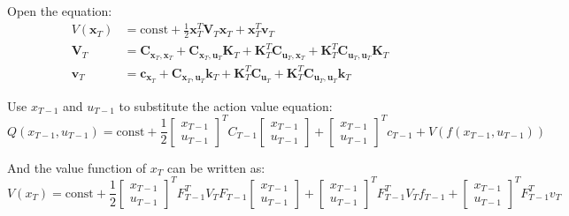 \documentclass[10pt]{elegantbook}
\begin{document}
Open the equation:
\begin{align*}
V(\bm{x}_T) &= \text{const} + \frac{1}{2} \bm{x}_T^T \bm{V}_T \bm{x}_T + \bm{x}_T^T \bm{v}_T \\
\bm{V}_T &= \bm{C}_{\bm{x}_T,\bm{x}_T} + \bm{C}_{\bm{x}_T,\bm{u}_T} \bm{K}_T + \bm{K}_T^T \bm{C}_{\bm{u}_T,\bm{x}_T} + \bm{K}_T^T \bm{C}_{\bm{u}_T,\bm{u}_T} \bm{K}_T \\
\bm{v}_T &= \bm{c}_{\bm{x}_T} + \bm{C}_{\bm{x}_T,\bm{u}_T} \bm{k}_T + \bm{K}_T^T \bm{C}_{\bm{u}_T} + \bm{K}_T^T \bm{C}_{\bm{u}_T,\bm{u}_T} \bm{k}_T
\end{align*}

Use $x_{T-1}$ and $u_{T-1}$ to substitute the action value equation:
\[ Q(x_{T-1}, u_{T-1}) = \text{const} +
\frac{1}{2} 
\begin{bmatrix}
    x_{T-1} \\ 
    u_{T-1}
\end{bmatrix}^T C_{T-1}
\begin{bmatrix}
    x_{T-1} \\ 
    u_{T-1}
\end{bmatrix} + 
\begin{bmatrix}
    x_{T-1} \\ 
    u_{T-1}
\end{bmatrix}^T c_{T-1}
+
V(f(x_{T-1}, u_{T-1}))
\]

And the value function of $x_T$ can be written as:
\[ 
V(x_T) = \text{const} + \frac{1}{2}
\begin{bmatrix}
x_{T-1} \\
u_{T-1}
\end{bmatrix}^T
F_{T-1}^T V_T F_{T-1}
\begin{bmatrix}
x_{T-1} \\
u_{T-1}
\end{bmatrix}
+ \begin{bmatrix}
x_{T-1} \\
u_{T-1}
\end{bmatrix}^T F_{T-1}^T V_T f_{T-1}
+ \begin{bmatrix}
x_{T-1} \\
u_{T-1}
\end{bmatrix}^T F_{T-1}^T v_T
\]
\end{document}
